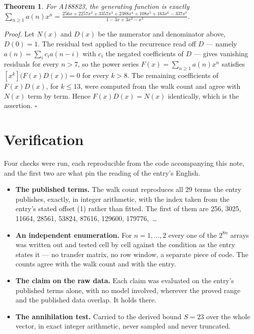\documentclass[11pt]{article}
\newtheorem{theorem}{Theorem}
\theoremstyle{definition}
\begin{document}
\begin{theorem} For A188823, the generating function is exactly $\sum_{n\ge 1} a(n)x^n = \frac{256x + 2257x^{2} + 3357x^{3} + 2388x^{4} + 108x^{5} + 163x^{6} - 337x^{7}}{1 - 3x + 3x^{2} - x^{3}}$.\end{theorem}

{\itshape Proof.} Let $N(x)$ and $D(x)$ be the numerator and denominator above, $D(0)=1$. The residual test applied to the recurrence read off $D$ --- namely $a(n) = \sum_i c_i a(n-i)$ with $c_i$ the negated coefficients of $D$ --- gives vanishing residuals for every $n > 7$, so the power series $F(x)=\sum_{n\ge 1}a(n)x^n$ satisfies $[x^k]\bigl(F(x)D(x)\bigr) = 0$ for every $k > 8$. The remaining coefficients of $F(x)D(x)$, for $k \le 13$, were computed from the walk count and agree with $N(x)$ term by term. Hence $F(x)D(x) = N(x)$ identically, which is the assertion. $\square$

\section{Verification}

Four checks were run, each reproducible from the code accompanying this note, and the first two are what pin the reading of the entry's English.

\begin{itemize}

\item {\bfseries The published terms.} The walk count reproduces all 29 terms the entry publishes, exactly, in integer arithmetic, with the index taken from the entry's stated offset (1) rather than fitted. The first of them are 256, 3025, 11664, 28561, 53824, 87616, 129600, 179776,~\dots

\item {\bfseries An independent enumeration.} For $n = 1,\dots,2$ every one of the $2^{8n}$ arrays was written out and tested cell by cell against the condition as the entry states it --- no transfer matrix, no row window, a separate piece of code. The counts agree with the walk count and with the entry.

\item {\bfseries The claim on the raw data.} Each claim was evaluated on the entry's published terms alone, with no model involved, wherever the proved range and the published data overlap. It holds there.

\item {\bfseries The annihilation test.} Carried to the derived bound $S = 23$ over the whole vector, in exact integer arithmetic, never sampled and never truncated.

\end{itemize}
\end{document}
